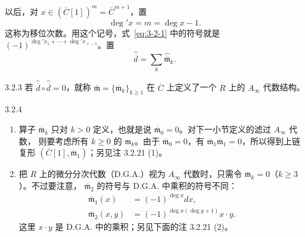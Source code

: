 以后，对 $x\in(\overline C[1])^m=\overline C^{m+1}$，置
\begin{equation}
  \deg' x=m=\deg x-1.
  \tag{3.2.2}\label{eq:3-2-2}
\end{equation}
这称为移位次数。用这个记号，式~\eqref{eq:3-2-1} 中的符号就是
$(-1)^{\deg' x_1+\cdots+\deg' x_{\ell-1}}$。置
\[
  \widehat{\overline d}
  =\sum_k\widehat{\overline{\mathfrak m}}_k.
\]

\begin{definition}{3.2.3}\label{def:3-2-3}
若 $\widehat{\overline d}\circ\widehat{\overline d}=0$，就称
$\overline{\mathfrak m}=\{\overline{\mathfrak m}_k\}_{k\geq1}$
在 $\overline C$ 上定义了一个 $R$ 上的
$A_\infty$ 代数结构。
\end{definition}

\begin{remark}{3.2.4}\label{rem:3-2-4}
\begin{enumerate}[label=\textup{(\arabic*)},leftmargin=2.8em]
  \item 算子 $\overline{\mathfrak m}_k$ 只对 $k>0$ 定义，也就是说
  $\overline{\mathfrak m}_0=0$。对下一小节定义的滤过 $A_\infty$ 代数，
  则要考虑所有 $k\geq0$ 的 $\mathfrak m_k$。由于
  $\overline{\mathfrak m}_0=0$，有
  $\overline{\mathfrak m}_1\overline{\mathfrak m}_1=0$，所以得到上链复形
  $(\overline C[1],\overline{\mathfrak m}_1)$；另见注 3.2.21 (1)。

  \item 把 $R$ 上的微分分次代数（D.G.A.）视为 $A_\infty$ 代数时，只需令
  $\overline{\mathfrak m}_k=0$（$k\geq3$）。不过要注意，
  $\overline{\mathfrak m}_2$ 的符号与 D.G.A. 中乘积的符号不同：
  \begin{equation}
  \begin{aligned}
    \overline{\mathfrak m}_1(x)
      &=(-1)^{\deg x}dx,\\
    \overline{\mathfrak m}_2(x,y)
      &=(-1)^{\deg x(\deg y+1)}x\mathbin{\cdot}y.
  \end{aligned}
  \tag{3.2.5}\label{eq:3-2-5}
  \end{equation}
  这里 $x\mathbin{\cdot}y$ 是 D.G.A. 中的乘积；另见下面的注 3.2.21 (2)。
\end{enumerate}
\end{remark}


